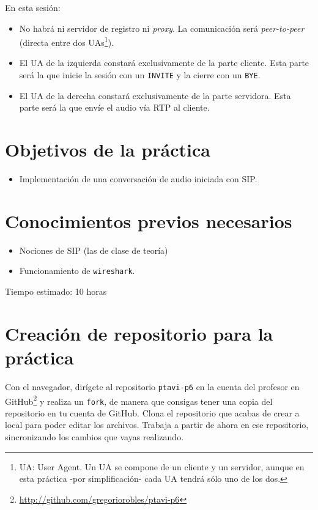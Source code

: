 \documentclass[a4paper,11pt]{article}
\begin{document}
En esta sesión:

\begin{itemize}
  \item No habrá ni servidor de registro ni \emph{proxy}. La comunicación será \emph{peer-to-peer} (directa entre dos UAs\footnote{UA: User Agent. Un UA se compone de un cliente y un servidor, aunque en esta práctica -por simplificación- cada UA tendrá sólo uno de los dos.}).
  \item El UA de la izquierda constará exclusivamente de la parte cliente. Esta parte será la que inicie la sesión con un \texttt{INVITE} y la cierre con un \texttt{BYE}.
  \item El UA de la derecha constará exclusivamente de la parte servidora. Esta parte será la que envíe el audio vía RTP al cliente.
\end{itemize}


\section*{Objetivos de la práctica}

\begin{itemize}
  \item Implementación de una conversación de audio iniciada con SIP.
\end{itemize}

\section*{Conocimientos previos necesarios}

\begin{itemize}
  \item Nociones de SIP (las de clase de teoría)
  \item Funcionamiento de \texttt{wireshark}.
\end{itemize}

Tiempo estimado: 10 horas

\section*{Creación de repositorio para la práctica}

Con el navegador, dirígete al repositorio \texttt{ptavi-p6} en la cuenta del profesor en GitHub\footnote{\url{http://github.com/gregoriorobles/ptavi-p6}} y realiza un \texttt{fork}, de manera que consigas tener una copia del repositorio en tu cuenta de GitHub. Clona el repositorio que acabas de crear a local para poder editar los archivos. Trabaja a partir de ahora en ese repositorio, sincronizando los cambios que vayas realizando.
\end{document}
